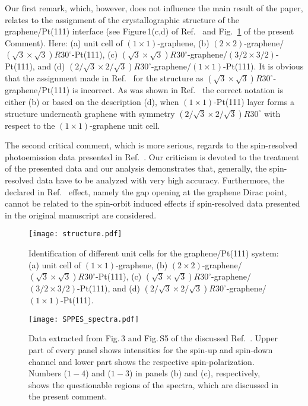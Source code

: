 \documentclass[twocolumn,preprintnumbers,amsmath,amssymb,prl]{revtex4}
\begin{document}
Our first remark, which, however, does not influence the main result of the paper, relates to the assignment of the crystallographic structure of the graphene/Pt(111) interface (see Figure\,1(c,d) of Ref.~ and Fig.~\ref{structure} of the present Comment). Here: (a) unit cell of $(1\times1)$-graphene, (b) $(2\times2)$-graphene/$(\sqrt{3}\times\sqrt{3})R30^\circ$-Pt(111), (c) $(\sqrt{3}\times\sqrt{3})R30^\circ$-graphene/$(3/2\times3/2)$-Pt(111), and (d) $(2/\sqrt{3}\times2/\sqrt{3})R30^\circ$-graphene/$(1\times1)$-Pt(111). It is obvious that the assignment made in Ref.~ for the structure as $(\sqrt{3}\times\sqrt{3})R30^\circ$-graphene/Pt(111) is incorrect. As was shown in Ref.~ the correct notation is either (b) or based on the description (d), when $(1\times1)$-Pt(111) layer forms a structure underneath graphene with symmetry $(2/\sqrt{3}\times2/\sqrt{3})R30^\circ$ with respect to the $(1\times1)$-graphene unit cell.

The second critical comment, which is more serious, regards to the spin-resolved photoemission data presented in Ref.~. Our criticism is devoted to the treatment of the presented data and our analysis demonstrates that, generally, the spin-resolved data have to be analyzed with very high accuracy. Furthermore, the declared in Ref.~ effect, namely the gap opening at the graphene Dirac point, cannot be related to the spin-orbit induced effects if spin-resolved data presented in the original manuscript are considered.

\begin{figure}[b]
\texttt{[image: structure.pdf]}\\
\caption{Identification of different unit cells for the graphene/Pt(111) system: (a) unit cell of $(1\times1)$-graphene, (b) $(2\times2)$-graphene/$(\sqrt{3}\times\sqrt{3})R30^\circ$-Pt(111), (c) $(\sqrt{3}\times\sqrt{3})R30^\circ$-graphene/$(3/2\times3/2)$-Pt(111), and (d) $(2/\sqrt{3}\times2/\sqrt{3})R30^\circ$-graphene/$(1\times1)$-Pt(111).}
\label{structure}                                                                                            
\end{figure}

\begin{figure*}[t]
\texttt{[image: SPPES\_spectra.pdf]}\\
\caption{Data extracted from Fig.\,3 and Fig.\,S5 of the discussed Ref.~. Upper part of every panel shows intensities for the spin-up and spin-down channel and lower part shows the respective spin-polarization. Numbers ($1-4$) and ($1-3$) in panels (b) and (c), respectively, shows the questionable regions of the spectra, which are discussed in the present comment.}
\label{SPPES_spectra}                                                                                            
\end{figure*}
\end{document}
